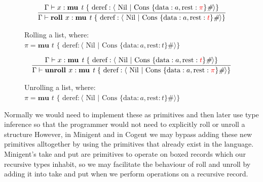 \begin{figure}
    \centering
    \begin{align*}
        \infer{
            \Gamma \vdash \textbf{roll } x : \textbf{mu } \textit{t } \{ \text{ deref}: \langle \text{ Nil } \vert \text{ Cons } \{ \text{data}: a, \text{rest}: {\color{red} t} \}\textit{\#} \rangle \} 
        }{
            \Gamma \vdash x : \textbf{mu } \textit{t } \{ \text{ deref}: \langle \text{ Nil } \vert \text{ Cons } \{ \text{data}: a, \text{rest}: {\color{red} \pi} \}\textit{\#} \rangle \} 
        }
    \end{align*}
    \caption{Rolling a list, where: \newline \protect\phantom{Figure x.x:} $\pi = \textbf{mu } \textit{t } \{ \text{ deref}: \langle \text{ Nil } \vert \text{ Cons } \{ \text{data}: a, \text{rest}: t \}\textit{\#} \rangle \}$}
    \label{fig:rollexample}
\end{figure}

\begin{figure}
    \centering
    \begin{align*}
        \infer{
            \Gamma \vdash \textbf{unroll } x : \textbf{mu } \textit{t } \{ \text{ deref}: \langle \text{ Nil } \vert \text{ Cons } \{ \text{data}: a, \text{rest}: {\color{red} \pi}  \}\textit{\#} \rangle \} 
        }{
            \Gamma \vdash x : \textbf{mu } \textit{t } \{ \text{ deref}: \langle \text{ Nil } \vert \text{ Cons } \{ \text{data}: a, \text{rest}: {\color{red} t} \}\textit{\#} \rangle \} 
        }
    \end{align*}
    \caption{Unrolling a list, where: \newline \protect\phantom{Figure x.x:} $\pi = \textbf{mu } \textit{t } \{ \text{ deref}: \langle \text{ Nil } \vert \text{ Cons } \{ \text{data}: a, \text{rest}: t \}\textit{\#} \rangle \}$}
    \label{fig:unrollexample}
\end{figure}

Normally we would need to implement these as primitives and then later use type inference so that
the programmer would not need to explicitly roll or unroll a structure However,
in Minigent and in Cogent we may bypass adding these new primitives alltogether by using the primitives
that already exist in the language. Minigent's \textsf{take} and \textsf{put} are primitives to
operate on boxed records which our recursive types inhabit, so we may facilitate the behaviour
of roll and unroll by adding it into take and put when we perform operations on a recursive record.

